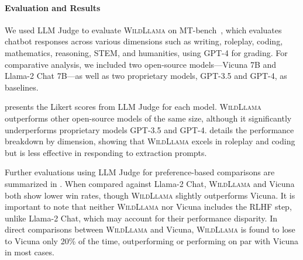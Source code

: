 \documentclass{article} %
\newcommand{\model}{\textsc{WildLlama}\xspace}
\begin{document}
\paragraph{Evaluation and Results}
We used LLM Judge to evaluate \model on MT-bench~\citep{zheng2023judging}, which evaluates chatbot responses across various dimensions such as writing, roleplay, coding, mathematics, reasoning, STEM, and humanities, using GPT-4 for grading. For comparative analysis, we included two open-source models---Vicuna 7B and Llama-2 Chat 7B---as well as two proprietary models, GPT-3.5 and GPT-4, as baselines.

 presents the Likert scores from LLM Judge for each model. \model outperforms other open-source models of the same size, although it significantly underperforms proprietary models GPT-3.5 and GPT-4.  details the performance breakdown by dimension, showing that \model excels in roleplay and coding but is less effective in responding to extraction prompts.

Further evaluations using LLM Judge for preference-based comparisons are summarized in . When compared against Llama-2 Chat, \model and Vicuna both show lower win rates, though \model slightly outperforms Vicuna. It is important to note that neither \model nor Vicuna includes the RLHF step, unlike Llama-2 Chat, which may account for their performance disparity. In direct comparisons between \model and Vicuna, \model is found to lose to Vicuna only 20\% of the time, outperforming or performing on par with Vicuna in most cases.


\end{document}
